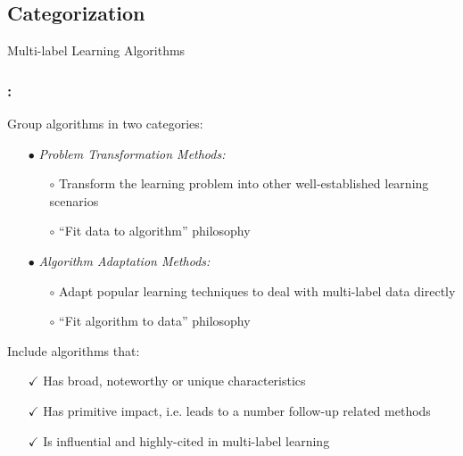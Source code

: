 \documentclass{beamer}
\begin{document}
\subsection{Categorization}
\begin{frame}
\Huge{\centerline{Multi-label Learning Algorithms}}
\end{frame}
\begin{frame}
\frametitle{\insertsection : \insertsubsection}

Group algorithms in two categories:
\begin{itemize}
\item[$\bullet$] \emph{Problem Transformation Methods:}

\begin{itemize}
\item[$\circ$] Transform the learning problem into other well-established learning scenarios
\item[$\circ$] ``Fit data to algorithm'' philosophy
\end{itemize}

\item[$\bullet$] \emph{Algorithm Adaptation Methods:}
\begin{itemize}
\item[$\circ$] Adapt popular learning techniques to deal with multi-label data directly
\item[$\circ$] ``Fit algorithm to data'' philosophy
\end{itemize}
\end{itemize}

Include algorithms that:
\begin{itemize}
\item[$\checkmark$] Has broad, noteworthy or unique characteristics
\item[$\checkmark$] Has primitive impact, i.e. leads to a number follow-up related methods
\item[$\checkmark$] Is influential and highly-cited in multi-label learning
\end{itemize}

\end{frame}
\end{document}
